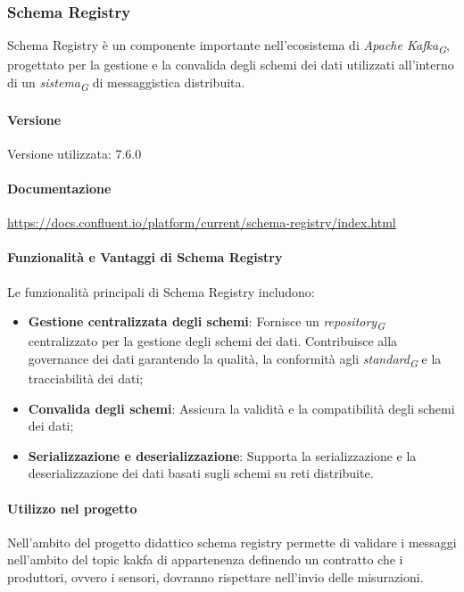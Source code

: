 \subsubsection{Schema Registry}
Schema Registry è un componente importante nell'ecosistema di \textit{Apache Kafka}\textsubscript{\textit{G}}, progettato per la gestione e la convalida degli schemi dei dati utilizzati all'interno di un \textit{sistema}\textsubscript{\textit{G}} di messaggistica distribuita.
\paragraph{Versione}
Versione utilizzata: 7.6.0
\paragraph{Documentazione}
\url{https://docs.confluent.io/platform/current/schema-registry/index.html}

\paragraph{Funzionalità e Vantaggi di Schema Registry}
Le funzionalità principali di Schema Registry includono:
\begin{itemize}
    \item \textbf{Gestione centralizzata degli schemi}: Fornisce un \textit{repository}\textsubscript{\textit{G}} centralizzato per la gestione degli schemi dei dati.
    Contribuisce alla governance dei dati garantendo la qualità, la conformità agli \textit{standard}\textsubscript{\textit{G}} e la tracciabilità dei dati;
    \item \textbf{Convalida degli schemi}: Assicura la validità e la compatibilità degli schemi dei dati;
    \item \textbf{Serializzazione e deserializzazione}: Supporta la serializzazione e la deserializzazione dei dati basati sugli schemi su reti distribuite.
\end{itemize}

\paragraph{Utilizzo nel progetto}
Nell'ambito del progetto didattico schema registry permette di validare i messaggi nell'ambito del topic kakfa di appartenenza definendo un contratto che i produttori, ovvero i sensori, dovranno rispettare nell'invio delle misurazioni.